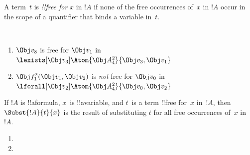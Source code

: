 \begin{defn}
A term~$t$ is \emph{!!{free for}} $x$ in $!A$ if none of the free
occurrences of~$x$ in $!A$ occur in the scope of a quantifier that
binds a variable in~$t$.
\end{defn}

\begin{ex} ~
\begin{enumerate}
\item $\Obj v_8$ is free for $\Obj v_1$ in $\lexists[\Obj
  v_3]\Atom{\Obj A^2_4}{\Obj v_3,\Obj v_1}$

\item $\Obj f^2_1(\Obj v_1, \Obj v_2)$ is \emph{not} free for $\Obj
  v_0$ in $\lforall[\Obj v_2]\Atom{\Obj A^2_4}{\Obj v_0,\Obj v_2}$
\end{enumerate}
\end{ex}

\begin{defn}
If $!A$ is !!a{formula}, $x$~is !!a{variable}, and $t$~is a term
!!{free for}~$x$ in~$!A$, then $\Subst{!A}{t}{x}$ is the result of
substituting $t$ for all free occurrences of~$x$ in~$!A$.
\begin{enumerate}



\item {}

\item {}










\end{enumerate}
\end{defn}

